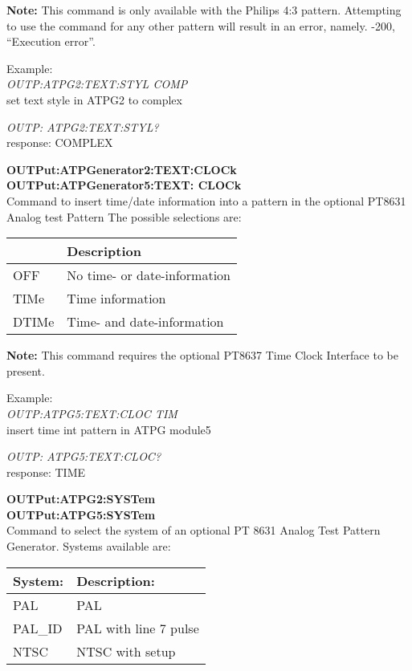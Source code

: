 \textbf{Note:} This command is only available with the Philips 4:3 pattern. Attempting to use the command for any other pattern will result in an error, namely. -200, ``Execution error''.

Example:\\
\textit{OUTP:ATPG2:TEXT:STYL COMP}\\
set text style in ATPG2 to complex

\textit{OUTP: ATPG2:TEXT:STYL?}\\
response: COMPLEX

\textbf{OUTPut:ATPGenerator2:TEXT:CLOCk}\\
\textbf{OUTPut:ATPGenerator5:TEXT: CLOCk}\\
Command to insert time/date information into a pattern in the optional PT8631 Analog test Pattern The possible selections are:

\begin{tabular}{|l|l|}
\hline
 & Description \\
\hline
OFF 	& No time- or date-information \\ \hline
TIMe	& Time information \\ \hline
DTIMe	& Time- and date-information \\ 
\hline
\end{tabular}

\textbf{Note:} This command requires the optional PT8637 Time Clock Interface to be present.

Example:\\
\textit{OUTP:ATPG5:TEXT:CLOC TIM}\\
insert time int pattern in ATPG module5

\textit{OUTP: ATPG5:TEXT:CLOC?}\\
response: TIME

\textbf{OUTPut:ATPG2:SYSTem}\\
\textbf{OUTPut:ATPG5:SYSTem}\\
Command to select the system of an optional PT 8631 Analog Test Pattern Generator. Systems available are:

\begin{tabular}{|l|l|}
\hline
\textbf{System:} & \textbf{Description:} \\ \hline
PAL & PAL \\ \hline
PAL\_ID & PAL with line 7 pulse \\ \hline
NTSC & NTSC with setup \\ \hline
\end{tabular}

